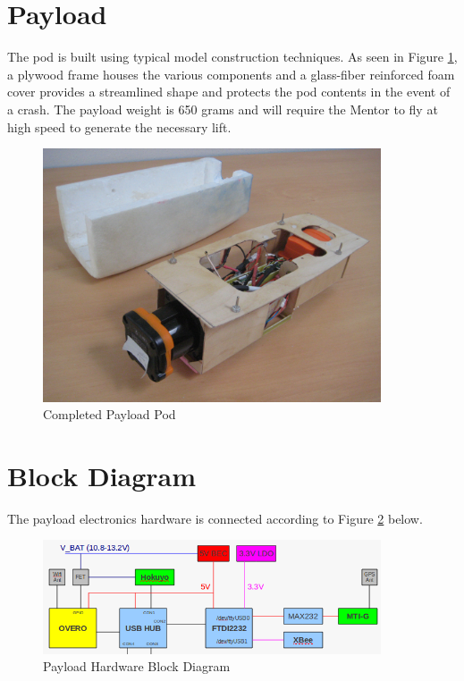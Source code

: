 \documentclass[a4paper,11pt]{report}
\begin{document}
\section{Payload}

The pod is built using typical model construction techniques. As seen in Figure \ref{fig:payload}, a plywood frame houses the various components and a glass-fiber reinforced foam cover provides a streamlined shape and protects the pod contents in the event of a crash. The payload weight is 650 grams and will require the Mentor to fly at high speed to generate the necessary lift.

\begin{figure}[ht]
 \centering
 \includegraphics[width=10cm]{./Mentor1_payload2.jpg}
 \caption{Completed Payload Pod}
 \label{fig:payload}
\end{figure}

\section{Block Diagram}

The payload electronics hardware is connected according to Figure \ref{fig:hwdiagram} below.

\begin{figure}[ht]
 \centering
 \includegraphics[width=10cm]{./payload_hardware_block_diagram.png}
 \caption{Payload Hardware Block Diagram}
 \label{fig:hwdiagram}
\end{figure}
\end{document}
